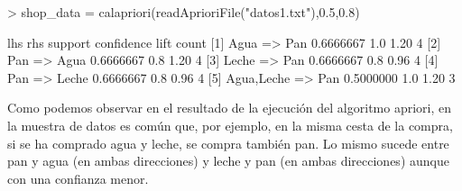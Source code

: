 \documentclass [a4paper] {article}
\begin{document}
\begin{Schunk}
\begin{Sinput}
> shop_data = calapriori(readAprioriFile("datos1.txt"),0.5,0.8)
\end{Sinput}
\begin{Soutput}
    lhs             rhs     support   confidence lift count
[1] {Agua}       => {Pan}   0.6666667 1.0        1.20 4    
[2] {Pan}        => {Agua}  0.6666667 0.8        1.20 4    
[3] {Leche}      => {Pan}   0.6666667 0.8        0.96 4    
[4] {Pan}        => {Leche} 0.6666667 0.8        0.96 4    
[5] {Agua,Leche} => {Pan}   0.5000000 1.0        1.20 3    
\end{Soutput}
\end{Schunk}
Como podemos observar en el resultado de la ejecución del algoritmo apriori, en la muestra de datos es común que, por ejemplo, 
en la misma cesta de la compra, si se ha comprado agua y leche, se compra también pan. Lo mismo sucede entre pan y agua (en ambas direcciones) y 
leche y pan (en ambas direcciones) aunque con una confianza menor.
\end{document}
